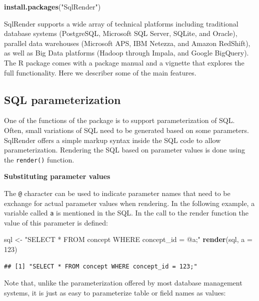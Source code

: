 \documentclass[11pt]{book}
\newenvironment{Shaded}{\begin{snugshade}}{\end{snugshade}}
\newcommand{\KeywordTok}[1]{\textcolor[rgb]{0.13,0.29,0.53}{\textbf{#1}}}
\newcommand{\DataTypeTok}[1]{\textcolor[rgb]{0.13,0.29,0.53}{#1}}
\newcommand{\DecValTok}[1]{\textcolor[rgb]{0.00,0.00,0.81}{#1}}
\newcommand{\StringTok}[1]{\textcolor[rgb]{0.31,0.60,0.02}{#1}}
\newcommand{\NormalTok}[1]{#1}
\begin{document}
\begin{Shaded}
\begin{Highlighting}[]
\KeywordTok{install.packages}\NormalTok{(}\StringTok{"SqlRender"}\NormalTok{)}
\end{Highlighting}
\end{Shaded}

SqlRender supports a wide array of technical platforms including
traditional database systems (PostgreSQL, Microsoft SQL Server, SQLite,
and Oracle), parallel data warehouses (Microsoft APS, IBM Netezza, and
Amazon RedShift), as well as Big Data platforms (Hadoop through Impala,
and Google BigQuery). The R package comes with a package manual and a
vignette that explores the full functionality. Here we describer some of
the main features.

\subsection{SQL parameterization}\label{sql-parameterization}

One of the functions of the package is to support parameterization of
SQL. Often, small variations of SQL need to be generated based on some
parameters. SqlRender offers a simple markup syntax inside the SQL code
to allow parameterization. Rendering the SQL based on parameter values
is done using the \texttt{render()} function.

\textbf{Substituting parameter values}

The \texttt{@} character can be used to indicate parameter names that
need to be exchange for actual parameter values when rendering. In the
following example, a variable called \texttt{a} is mentioned in the SQL.
In the call to the render function the value of this parameter is
defined:

\begin{Shaded}
\begin{Highlighting}[]
\NormalTok{sql <-}\StringTok{ "SELECT * FROM concept WHERE concept_id = @a;"}
\KeywordTok{render}\NormalTok{(sql, }\DataTypeTok{a =} \DecValTok{123}\NormalTok{)}
\end{Highlighting}
\end{Shaded}

\begin{verbatim}
## [1] "SELECT * FROM concept WHERE concept_id = 123;"
\end{verbatim}

Note that, unlike the parameterization offered by most database
management systems, it is just as easy to parameterize table or field
names as values:
\end{document}
